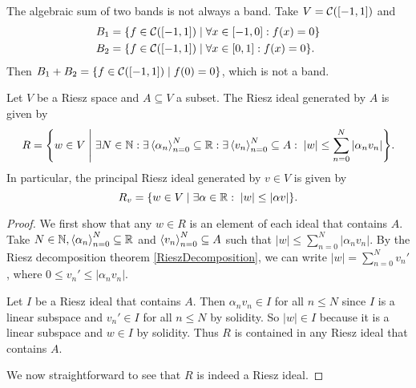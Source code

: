 \begin{example}
The algebraic sum of two bands is not always a band. Take $V = \cont(\interval{-1,1})$ and
\begin{align*}
B_1 &= \setbuilder{f\in\cont(\interval{-1,1})}{\forall x\in \interval{-1,0}: f(x) = 0} \\
B_2 &= \setbuilder{f\in\cont(\interval{-1,1})}{\forall x\in \interval{0,1}: f(x) = 0}.
\end{align*}
Then $B_1+B_2 = \setbuilder{f\in\cont(\interval{-1,1})}{f(0) = 0}$, which is not a band. 
\end{example}

\begin{lemma} \label{generatedRieszIdeals}
Let $V$ be a Riesz space and $A\subseteq V$ a subset. The Riesz ideal generated by $A$ is given by
\[ R = \setbuilder{w\in V}{\exists N\in \N: \exists \seq{\alpha_n}_{n=0}^N \subseteq \R: \exists \seq{v_n}_{n=0}^N \subseteq A: \; |w| \leq \sum_{n=0}^N |\alpha_nv_n|}. \]
In particular, the principal Riesz ideal generated by $v\in V$ is given by
\[ R_v = \setbuilder{w\in V}{\exists \alpha\in \R: \; |w|\leq |\alpha v|}. \]
\end{lemma}
\begin{proof}
We first show that any $w\in R$ is an element of each ideal that contains $A$. Take $N\in \mathbb{N}, \left\langle \alpha_n \right\rangle_{n=0}^N \subseteq \mathbb{R}$ and $\left\langle v_n \right\rangle_{n=0}^N \subseteq A$ such that $|w| \leq \sum_{n=0}^N |\alpha_nv_n|$. By the Riesz decomposition theorem \ref{RieszDecomposition}, we can write $|w| = \sum_{n=0}^N v_{n}'$, where $0\leq v_n' \leq |\alpha_nv_n|$.

Let $I$ be a Riesz ideal that contains $A$. Then $\alpha_nv_n \in I$ for all $n\leq N$ since $I$ is a linear subspace and $v_n'\in I$ for all $n\leq N$ by solidity. So $|w|\in I$ because it is a linear subspace and $w\in I$ by solidity. Thus $R$ is contained in any Riesz ideal that contains $A$.

We now straightforward to see that $R$ is indeed a Riesz ideal.
\end{proof}

